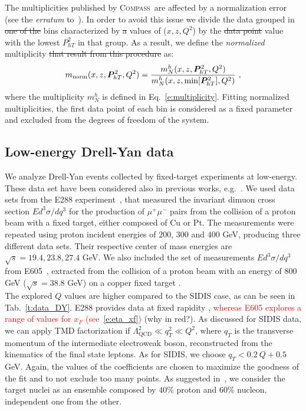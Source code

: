 \documentclass[aps,preprintnumbers,showpacs,nofootinbib,superscriptaddress,floatfix]{revtex4}
\newcommand{\AS}[1]{{\textcolor[rgb]{1,0,1}{#1}}}
\newcommand{\compass}{\textsc{Compass}}
\newcommand{\Tperp}{T}
\begin{document}
The multiplicities published by \compass\ are affected by a normalization error (see the {\em erratum} to~\cite{Adolph:2013stb}). \AS{In} order to avoid this issue we divide the data grouped in \AS{\sout{one of the} bins} characterized by \AS{\sout{a} values} of ($x, z, Q^2$) by the \AS{\sout{data point} value} with the lowest $P_{hT}^2$ in that group.
\AS{As a result, we} define the {\em normalized} multiplicity \AS{\sout{that result from this procedure}} as:
\begin{equation}
m_{\text{norm}}(x,z,\bm{P}_{h\Tperp}^2, Q^2) = \frac{m_N^h(x,z,\bm{P}_{h\Tperp}^2, Q^2)}{m_N^h (x,z,{\rm \min}[\bm{P}_{h\Tperp}^2], Q^2)} \ ,
\label{e:mult_norm}
\end{equation}
where the multiplicity $m_N^h$ is defined in Eq.~\eqref{e:multiplicity}. Fitting normalized multiplicities, the first data point of each bin is considered as a fixed parameter and excluded from the degrees of freedom of the system.

\subsection{Low-energy Drell-Yan data}
\label{ss:dy}

We analyze Drell-Yan events collected by fixed-target experiments at low-energy. These data set have been considered also in previous works, e.g.~\cite{DAlesio:2014mrz}. 
We used data sets from the E288 experiment~\cite{Ito:1980ev}, that measured the invariant dimuon cross section $E d^3\sigma / dq^3$ for the production of $\mu^+ \mu^-$ pairs from the collision of a proton beam with a fixed target, either composed of Cu or Pt.
The measurements were repeated using proton incident energies of $200$, $300$ and $400$ \AS{GeV}, producing three different data sets.
Their respective center of mass energies are $\sqrt{s}=19.4,23.8,27.4$ GeV.
We also included the set of measurements $E d^3\sigma / dq^3$ from E605~\cite{Moreno:1990sf}, extracted from the collision of a proton beam with an energy of $800$ \AS{GeV} ($\sqrt{s}=38.8$ GeV) on a copper fixed target .\\

The explored $Q$ values are higher compared to the SIDIS case, as can be seen in Tab.~\ref{t:data_DY}. E288 provides data at fixed rapidity ,\textcolor{red}{ whereas E605 explores a range of values for $x_F$ (see~\eqref{e:eta_xf})} \AS{(why in red?)}.  
As discussed for SIDIS data, we can apply TMD factorization if $\Lambda_{\text{QCD}}^2 \ll q_T^2 \ll Q^2$, where $q_T$ is the transverse momentum of the intermediate electroweak boson, reconstructed from the kinematics of the final state leptons. As for SIDIS, we choose $q_T < 0.2\ Q + 0.5$ GeV. Again, the values of the coefficients are chosen to maximize the goodness of the fit and to not exclude too many points.
\AS{As suggested in~\cite{Ito:1980ev}, we} consider the target nuclei as an ensemble composed by $40\%$ proton and $60\%$ nucleon,  independent one from the other.
\end{document}
